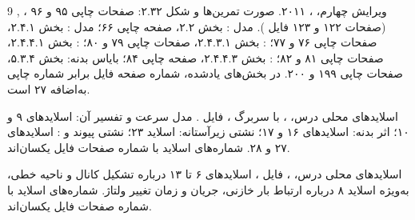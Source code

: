 \documentclass[12pt,a4paper]{article}
\newcommand{\exnum}[1]{\mbox{\beginL#1\endL}}
\begin{document}
\MakeAssignmentCover







\clearpage
\begin{thebibliography}{9}
,
،
ویرایش چهارم، ، ۲۰۱۱.
صورت تمرین‌ها و شکل \exnum{۲.۳۲}: صفحات چاپی ۹۵ و ۹۶
(صفحات ۱۲۲ و ۱۲۳ فایل ).
مدل : بخش \exnum{۲.۲}، صفحه چاپی ۶۶؛
مدل : بخش \exnum{۲.۴.۱}، صفحات چاپی ۷۶ و ۷۷؛
: بخش \exnum{۲.۴.۳.۱}، صفحات چاپی ۷۹ و ۸۰؛
: بخش \exnum{۲.۴.۴.۱}، صفحات چاپی ۸۱ و ۸۲؛
: بخش \exnum{۲.۴.۴.۳}، صفحه چاپی ۸۴؛
بایاس بدنه: بخش \exnum{۵.۳.۴}، صفحات چاپی ۱۹۹ و ۲۰۰.
در بخش‌های یادشده، شماره صفحه فایل برابر شماره چاپی به‌اضافه ۲۷ است.

اسلایدهای محلی درس، ،
با سربرگ ،
فایل .
مدل سرعت و تفسیر آن: اسلایدهای ۹ و ۱۰؛ اثر بدنه: اسلایدهای ۱۶ و ۱۷؛
نشتی زیرآستانه: اسلاید ۲۳؛ نشتی پیوند و : اسلایدهای ۲۷ و ۲۸.
شماره‌های اسلاید با شماره صفحات فایل یکسان‌اند.

اسلایدهای محلی درس، ،
فایل ،
اسلایدهای ۶ تا ۱۳ درباره تشکیل کانال و ناحیه خطی،
به‌ویژه اسلاید ۸ درباره ارتباط بار خازنی، جریان و زمان تغییر ولتاژ.
شماره‌های اسلاید با شماره صفحات فایل یکسان‌اند.
\end{thebibliography}
\end{document}
